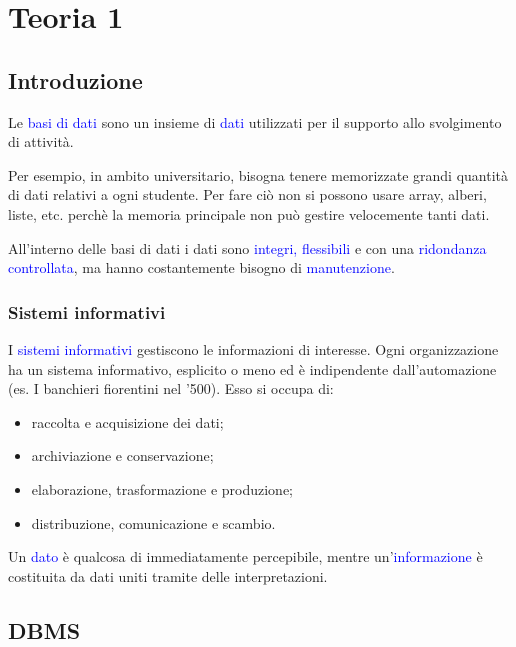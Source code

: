 \chapter{Teoria 1}

\section{Introduzione}

Le \textcolor{blue}{basi di dati} sono un insieme di \textcolor{blue}{dati} utilizzati per il supporto allo svolgimento di attività.

Per esempio, in ambito universitario, bisogna tenere memorizzate grandi quantità di dati relativi a ogni studente. Per fare ciò non si possono usare array, alberi, liste, etc. perchè la memoria principale non può gestire velocemente tanti dati. 

All'interno delle basi di dati i dati sono \textcolor{blue}{integri, flessibili} e con una \textcolor{blue}{ridondanza controllata}, ma hanno costantemente bisogno di \textcolor{blue}{manutenzione}.

\subsection{Sistemi informativi}

\label{Sistemi informativi}

I \textcolor{blue}{sistemi informativi} gestiscono le informazioni di interesse. Ogni organizzazione ha un sistema informativo, esplicito o meno ed è indipendente dall'automazione (es. I banchieri fiorentini nel '500). Esso si occupa di:
\begin{itemize}
    \item raccolta e acquisizione dei dati;
    \item archiviazione e conservazione;
    \item elaborazione, trasformazione e produzione;
    \item distribuzione, comunicazione e scambio.
\end{itemize}

Un \textcolor{blue}{dato} è qualcosa di immediatamente percepibile, mentre un'\textcolor{blue}{informazione} è costituita da dati uniti tramite delle interpretazioni. 

\section{DBMS}

